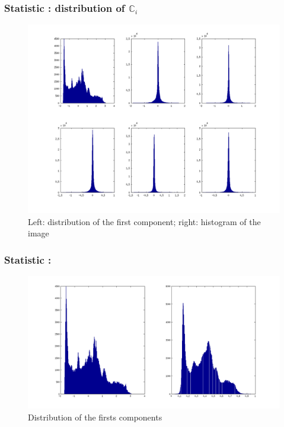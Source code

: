 \documentclass[compress]{beamer} %
\newcommand{\rand}[1]{\ensuremath{\mathbb{#1}}}
\begin{document}
 
\begin{frame}
\frametitle{Statistic : distribution of $\rand{C}_i$}
      \begin{figure}[h!]
      \centering
      \begin{minipage}{0.8\linewidth}
      \includegraphics[width=\linewidth]{hist}
	
      \end{minipage}

	  \caption{Left: distribution of the first component; right: histogram of the image}
      
      \end{figure}      
\end{frame}
 
\begin{frame}
\frametitle{Statistic :}
      \begin{figure}[h!]
      \centering
      \begin{minipage}{0.8\linewidth}
      \includegraphics[width=\linewidth]{h_1vs_hist}
      \end{minipage}
	  \caption{Distribution of the firsts components}
      \end{figure}     
\end{frame}
\end{document}

